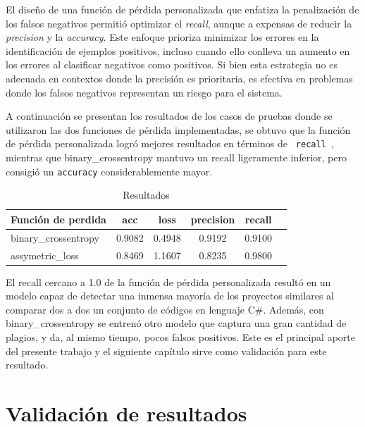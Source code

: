 El diseño de una función de pérdida personalizada que enfatiza la penalización de los falsos negativos permitió optimizar el \textit{recall}, aunque a expensas de reducir la \textit{precision} y la \textit{accuracy}. Este enfoque prioriza minimizar los errores en la identificación de ejemplos positivos, incluso cuando ello conlleva un aumento en los errores al clasificar negativos como positivos. Si bien esta estrategia no es adecuada en contextos donde la precisión es prioritaria, es efectiva en problemas donde los falsos negativos representan un riesgo para el sistema.

A continuación se presentan los resultados de los casos de pruebas donde se utilizaron las dos funciones de pérdida implementadas, se obtuvo que la función de pérdida personalizada logró mejores resultados en términos de \texttt{ recall }, mientras que binary\_crossentropy mantuvo un recall ligeramente inferior, pero consigió un \texttt{accuracy} considerablemente mayor.

\begin{table}[ht]
    \centering
    \caption{Resultados}
    \begin{tabular}{lccccc}
        \toprule
        \textbf{Función de perdida} & \textbf{acc} & \textbf{loss} & \textbf{precision}  & \textbf{recall} \\
        \midrule
        binary\_crossentropy  &  0.9082 &  0.4948 & 0.9192 & 0.9100 \\
        assymetric\_loss & 0.8469 & 1.1607 & 0.8235 & 0.9800  \\
        \bottomrule
    \end{tabular}
    \label{tab:results}
\end{table}

El recall cercano a 1.0 de la función de pérdida personalizada resultó en un modelo capaz de detectar una inmensa mayoría de los proyectos similares al comparar dos a dos un conjunto de códigos en lenguaje C\#. Además, con binary\_crossentropy se entrenó otro modelo que captura una gran cantidad de plagios, y da, al mismo tiempo, pocos falsos positivos. Este es el principal aporte del presente trabajo y el siguiente capítulo sirve como validación para este resultado.


\section{Validación de resultados}

